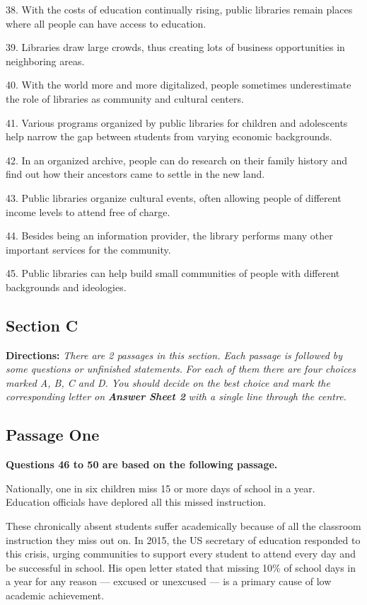 \documentclass[UTF8,11pt]{ctexart}
\begin{document}
38. With the costs of education continually rising, public libraries remain places where all people can have access to education.


39. Libraries draw large crowds, thus creating lots of business opportunities in neighboring areas.


40. With the world more and more digitalized, people sometimes underestimate the role of libraries as community and cultural centers.


41. Various programs organized by public libraries for children and adolescents help narrow the gap between students from varying economic backgrounds.


42. In an organized archive, people can do research on their family history and find out how their ancestors came to settle in the new land.


43. Public libraries organize cultural events, often allowing people of different income levels to attend free of charge.


44. Besides being an information provider, the library performs many other important services for the community.


45. Public libraries can help build small communities of people with different backgrounds and ideologies.


\subsection*{\textbf{Section C}}


\textbf{Directions: }\textit{There are 2 passages in this section. Each passage is followed by some questions or unfinished statements.} \textit{For each of them there are four choices marked A, B, C and D. You should decide on the best choice and mark the} \textit{corresponding letter on }\textbf{\textit{Answer Sheet 2}}\textit{ with a single line through the centre.}


\subsection*{\textbf{Passage One}}


\textbf{Questions 46 to 50 are based on the following passage.}


Nationally, one in six children miss 15 or more days of school in a year. Education officials have deplored all this missed instruction.


These chronically absent students suffer academically because of all the classroom instruction they miss out on. In 2015, the US secretary of education responded to this crisis, urging communities to support every student to attend every day and be successful in school. His open letter stated that missing 10\% of school days in a year for any reason — excused or unexcused — is a primary cause of low academic achievement.
\end{document}
